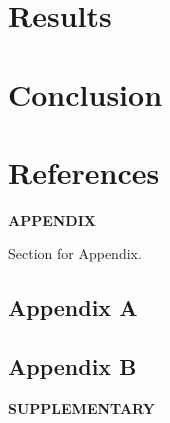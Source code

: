 \documentclass[
  11pt]{article}
\begin{document}
\section{Results}\label{sec-result}

\section{Conclusion}\label{sec-conc}

\section*{References}\label{references}

\renewcommand{\bibsection}{}


\label{appendix}
\bigskip

\begin{center}

{\large\bf APPENDIX}

\end{center}

Section for Appendix.

\subsection*{Appendix A}\label{appendix-a}

\subsection*{Appendix B}\label{appendix-b}

\label{supplementary}
\bigskip

\begin{center}

{\large\bf SUPPLEMENTARY}

\end{center}
\end{document}
